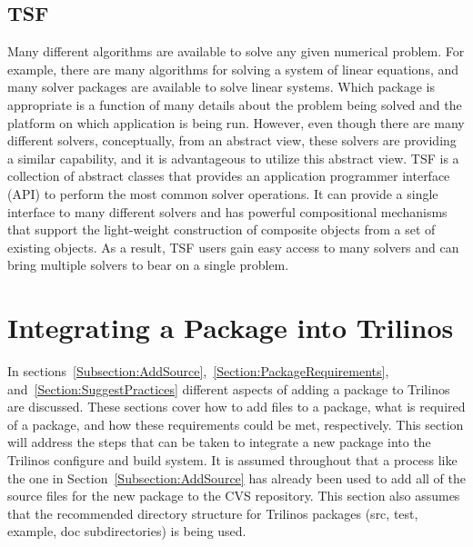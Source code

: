 \documentclass[12pt,relax]{TrilinosDevGuide}
\begin{document}
\subsection{TSF}
\label{subsect:InteropTSF}
Many different algorithms are available to solve any given numerical
problem.  For example, there are many algorithms for solving a system
of linear equations, and many solver packages are available to solve
linear systems.  Which package is appropriate is a function of
many details about the problem being solved and the platform on which
application is being run. However, even though
there are many different solvers, conceptually, from an abstract view,
these solvers are providing a similar capability, and it is
advantageous to utilize this abstract view.
TSF is a collection of abstract classes that provides an application
programmer interface (API) to perform the most common solver
operations.  It can provide a single interface to many different
solvers and has powerful compositional mechanisms that support the
light-weight construction of composite objects from a set of
existing objects.  As a result, TSF users gain easy access to many
solvers and can bring multiple solvers to bear on a single problem.

\section{Integrating a Package into Trilinos}
\label{Section:IntegratingPackages}
In sections~\ref{Subsection:AddSource},~\ref{Section:PackageRequirements}, 
and~\ref{Section:SuggestPractices} different aspects of adding a package to 
Trilinos are discussed.  These sections cover how to add files to a package,
what is required of a package, and how these requirements could be met, 
respectively.  This section will address the steps that can be taken to 
integrate a new package into the Trilinos configure and build system.  It is 
assumed throughout that a process like the one in 
Section~\ref{Subsection:AddSource} has already been used to add all of the 
source files for the new package to the CVS repository.  This section also 
assumes that the recommended directory structure for Trilinos packages 
(src, test, example, doc subdirectories) is being used.
\end{document}
